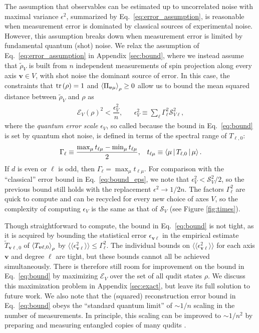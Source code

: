 \documentclass[nofootinbib,twocolumn]{revtex4-1}
\newcommand{\f}[2]{\dfrac{#1}{#2}} %
\newcommand{\p}[1]{\left(#1\right)} %
\newcommand{\bk}{\Braket} %
\newcommand{\bbk}[1]{\langle\!\langle #1 \rangle\!\rangle}
\newcommand{\E}{\mathcal{E}}
\renewcommand{\S}{\mathcal{S}}
\begin{document}
The assumption that observables can be estimated up to uncorrelated noise with maximal variance $\epsilon^2$, summarized by Eq.~\eqref{eq:error_assumption}, is reasonable when measurement error is dominated by classical sources of experimental noise.
However, this assumption breaks down when measurement error is limited by fundamental quantum (shot) noise.
We relax the assumption of Eq.~\eqref{eq:error_assumption} in Appendix \ref{sec:bound}, where we instead assume that $\tilde\rho_V$ is built from $n$ independent measurements of spin projection along every axis $\bm v\in V$, with shot noise the dominant source of error.
In this case, the constraints that $\tr\p\rho=1$ and $\bk{\Pi_{\bm v\mu}}_\rho\ge0$ allow us to bound the mean squared distance between $\tilde\rho_V$ and $\rho$ as
\begin{align}
  \E_V\p{\rho}^2 < \f{\epsilon_V^2}{n},
  &&
  \epsilon_V^2 \equiv \sum_\ell \Gamma_\ell^2 \S_{V\ell}^2,
  \label{eq:bound}
\end{align}
where the {\it quantum error scale} $\epsilon_V$, so called because the bound in Eq.~\eqref{eq:bound} is set by quantum shot noise, is defined in terms of the spectral range of $T_{\ell,0}$:
\begin{align}
  \Gamma_\ell \equiv \f{\max_\mu t_{\ell\mu} - \min_\mu t_{\ell\mu}}{2},
  &&
  t_{\ell\mu} \equiv \bk{\mu|T_{\ell,0}|\mu}.
\end{align}
If $d$ is even or $\ell$ is odd, then $\Gamma_\ell=\max_\mu t_{\ell\mu}$.
For comparison with the ``classical'' error bound in Eq.~\eqref{eq:bound_eps}, we note that $\epsilon_V^2<\S_V^2/2$, so the previous bound still holds with the replacement $\epsilon^2\to1/2n$.
The factors $\Gamma_\ell^2$ are quick to compute and can be recycled for every new choice of axes $V$, so the complexity of computing $\epsilon_V$ is the same as that of $\S_V$ (see Figure \ref{fig:times}).

Though straightforward to compute, the bound in Eq.~\eqref{eq:bound} is not tight, as it is acquired by bounding the statistical error $\epsilon_{\bm v\ell}$ in the empirical estimate $\tilde T_{\bm v\ell,0}$ of $\bk{T_{\bm v\ell,0}}_\rho$ by $\bbk{\epsilon_{\bm v\ell}^2}\le\Gamma_\ell^2$.
The individual bounds on $\bbk{\epsilon_{\bm v\ell}^2}$ for each axis $\bm v$ and degree $\ell$ are tight, but these bounds cannot all be achieved simultaneously.
There is therefore still room for improvement on the bound in Eq.~\eqref{eq:bound} by maximizing $\E_V$ over the set of all qudit states $\rho$.
We discuss this maximization problem in Appendix \ref{sec:exact}, but leave its full solution to future work.
We also note that the (squared) reconstruction error bound in Eq.~\eqref{eq:bound} obeys the ``standard quantum limit'' of $\sim1/n$ scaling in the number of measurements.
In principle, this scaling can be improved to $\sim1/n^2$ by preparing and measuring entangled copies of many qudits \cite{giovannetti2006quantum}.
\end{document}
